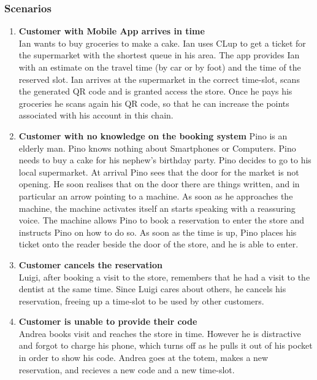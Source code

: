 \subsubsection{Scenarios}
    \begin{enumerate}[label=\Alph*.]
        \item {} \textbf{Customer with Mobile App arrives in time}\\
            Ian wants to buy groceries to make a cake. Ian uses CLup to get a ticket for the supermarket with the shortest queue in his area.
            The app provides Ian with an estimate on the travel time (by car or by foot) and the time of the reserved slot. 
            Ian arrives at the supermarket in the correct time-slot, scans the generated QR code and is granted access 
            the store. Once he pays
            his groceries he scans again his QR code, so that he can increase the points associated with his account in 
            this chain.

        \item \textbf{Customer with no knowledge on the booking system}
            Pino is an elderly man. Pino knows nothing about Smartphones or Computers. Pino needs to buy a cake for his
            nephew's birthday party. Pino decides to go to his local supermarket. At arrival Pino sees that the door for the market
            is not opening. He soon realises that on the door there are things written, and in particular an arrow pointing to a machine. 
            As soon as he approaches the machine, the machine activates itself an starts speaking with a reassuring voice. 
            The machine allows Pino to book a reservation to enter the store and instructs Pino on how to do so. 
            As soon as the time is up, Pino places his ticket onto the reader beside the door of the store, and he is able to enter. 

        \item \textbf{Customer cancels the reservation}\\
            Luigi, after booking a visit to the store, remembers that he had a visit to the dentist at the same time.
            Since Luigi cares about others, he cancels his reservation, freeing up a time-slot to be used by other customers.

        \item \textbf{Customer is unable to provide their code}\\
            Andrea books visit and reaches the store in time.
            However he is distractive and forgot to charge his phone, which turns off as he pulls it out of his pocket in order to show his code.
            Andrea goes at the totem, makes a new reservation, 
            and recieves a new code and a new time-slot.
    \end{enumerate}






